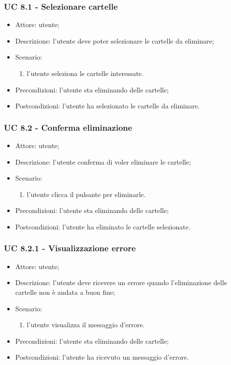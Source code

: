     \subsubsection{UC 8.1 - Selezionare cartelle} \label{sec: UC 8.1}
    \begin{itemize}
        \item Attore: utente;
        \item Descrizione: l'utente deve poter selezionare le cartelle da eliminare;
        \item Scenario:
        \begin{enumerate}
        \item l'utente seleziona le cartelle interessate.
        \end{enumerate}
        \item Precondizioni: l'utente sta eliminando delle cartelle;
        \item Postcondizioni: l'utente ha selezionato le cartelle da eliminare.
    \end{itemize}

    \subsubsection{UC 8.2 - Conferma eliminazione} \label{sec: UC 8.2}
    \begin{itemize}
        \item Attore: utente;
        \item Descrizione: l'utente conferma di voler eliminare le cartelle;
        \item Scenario:
        \begin{enumerate}
        \item l'utente clicca il pulsante per eliminarle.
        \end{enumerate}
        \item Precondizioni: l'utente sta eliminando delle cartelle;
        \item Postcondizioni: l'utente ha eliminato le cartelle selezionate.
    \end{itemize}

    \subsubsection{UC 8.2.1 - Visualizzazione errore } \label{sec: UC 8.2.1}
    \begin{itemize}
        \item Attore: utente;
        \item Descrizione: l'utente deve ricevere un errore quando l'eliminazione delle cartelle non è andata a buon fine;
        \item Scenario:
        \begin{enumerate}
        \item l'utente visualizza il messaggio d'errore.
        \end{enumerate}   
        \item Precondizioni: l'utente sta eliminando delle cartelle;
        \item Postcondizioni: l'utente ha ricevuto un messaggio d'errore.
    \end{itemize}

